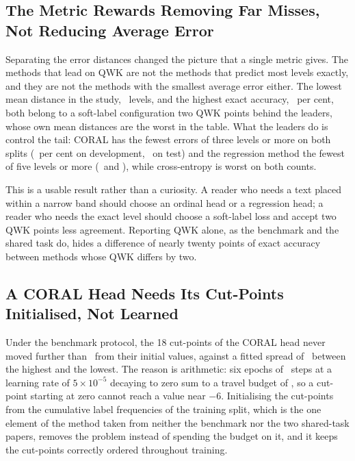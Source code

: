 \subsection{The Metric Rewards Removing Far Misses, Not Reducing Average Error}

Separating the error distances changed the picture that a single metric gives. The methods that
lead on QWK are not the methods that predict most levels exactly, and they are not the methods
with the smallest average error either. The lowest mean distance in the study,
\devDistSoftTwo\ levels, and the highest exact accuracy, \devAccSoftTwo\ per cent, both belong
to a soft-label configuration two QWK points behind the leaders, whose own mean distances are
the worst in the table. What the leaders do is control the tail: CORAL has the fewest errors of
three levels or more on both splits (\devFarThreeCoral\ per cent on development,
\testFarThreeCoral\ on test) and the regression method the fewest of five levels or more
(\devFarFiveMSE\ and \testFarFiveMSE), while cross-entropy is worst on both counts.

This is a usable result rather than a curiosity. A reader who needs a text placed within a
narrow band should choose an ordinal head or a regression head; a reader who needs the exact
level should choose a soft-label loss and accept two QWK points less agreement. Reporting QWK
alone, as the benchmark and the shared task do, hides a difference of nearly twenty points of
exact accuracy between methods whose QWK differs by two.

\subsection{A CORAL Head Needs Its Cut-Points Initialised, Not Learned}

Under the benchmark protocol, the 18 cut-points of the CORAL head never moved further than
\cutMoveFineCoral\ from their initial values, against a fitted spread of \cutSpreadCoral\
between the highest and the lowest. The reason is arithmetic: six epochs of \stepsPerEpoch\
steps at a learning rate of $5\times10^{-5}$ decaying to zero sum to a travel budget of
\lrSumEncoder, so a cut-point starting at zero cannot reach a value near $-6$. Initialising the
cut-points from the cumulative label frequencies of the training split, which is the one
element of the method taken from neither the benchmark nor the two shared-task papers, removes
the problem instead of spending the budget on it, and it keeps the cut-points correctly ordered
throughout training.

